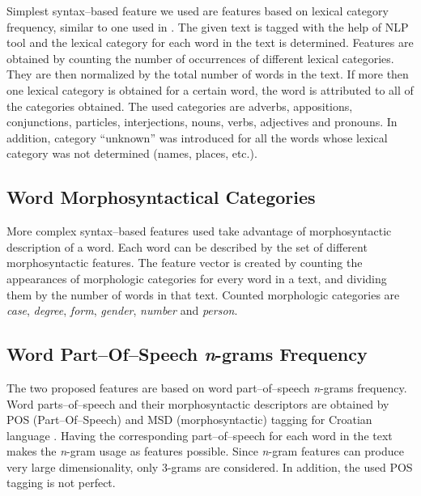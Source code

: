 \documentclass{llncs}
\begin{document}
Simplest syntax--based feature we used are features based on lexical category
frequency, similar to one used in \cite{kukushkina2001using}. The given text is
tagged with the help of NLP tool and the lexical category for each word in the text is determined.
Features are obtained by counting the number of occurrences of different lexical categories. They are
then normalized by the total number of words in the text. If more
then one lexical category is obtained for a certain word, the word is attributed to all of the categories obtained. 
The used categories are adverbs, appositions, conjunctions, particles,
interjections, nouns, verbs, adjectives and pronouns. In addition, category
``unknown'' was introduced for all the words whose lexical category was not
determined (names, places, etc.).

\subsection{Word Morphosyntactical Categories}
\label{sec:morphosyntactic}

More complex syntax--based features used take advantage of morphosyntactic
description of a word. Each word can be described by the set of different
morphosyntactic features. The feature vector is created by
counting the appearances of morphologic categories for every word in a text, and dividing them by the number of words in
that text. Counted morphologic categories are \emph{case}, \emph{degree},
\emph{form}, \emph{gender}, \emph{number} and \emph{person}.

\subsection{Word Part--Of--Speech \emph{n}-grams Frequency}
\label{sec:ngrami-tipova}
The two proposed features are based on word part--of--speech \emph{n}-grams
frequency. Word parts--of--speech and their morphosyntactic descriptors are obtained by POS
(Part--Of--Speech) and MSD (morphosyntactic) tagging for Croatian language
\cite{snajder08automatic}. Having the corresponding part--of--speech for
each word in the text makes the \emph{n}-gram usage as features
possible. Since \emph{n}-gram features can produce very large dimensionality,
only 3-grams are considered. In addition, the used POS tagging is not perfect. 
\end{document}
